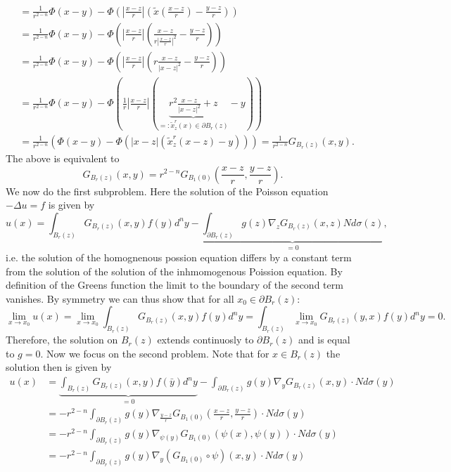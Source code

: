 \documentclass[A4,12pt,twoside]{book}
\begin{document}
{\begin{align*}
        &= \frac{1}{r^{2-n}}  \Phi (x-y) -  \Phi ( |\frac{x-z}{r}| (\tilde{x}(\frac{x-z}{r}) -\frac{y-z}{r})) \\
        &= \frac{1}{r^{2-n}}  \Phi (x-y) -  \Phi (  |\frac{x-z}{r}| (\frac{x-z}{r|\frac{x-z}{r}|^2} -\frac{y-z}{r})) \\
        &= \frac{1}{r^{2-n}}  \Phi (x-y) -  \Phi ( |\frac{x-z}{r}| (r \frac{x-z}{|x-z|^2} -\frac{y-z}{r})) \\
        &= \frac{1}{r^{2-n}}  \Phi (x-y) -  \Phi ( \frac{1}{r} |\frac{x-z}{r}| (\underbrace{r^2 \frac{x-z}{|x-z|^2} + z}_{=: \tilde{x}_z^r (x) \in \partial B_r (z)}-y)) \\
        &= \frac{1}{r^{2-n}} \left( \Phi (x-y) - \Phi ( |x-z| (\tilde{x}_z^r (x-z) -y))  \right) = \frac{1}{r^{2-n}} G_{B_r (z)} (x,y).
    \end{align*}
    The above is equivalent to 
    \[
    G_{B_r (z)} (x,y) = r^{2-n} G_{B_1 (0)} ( \frac{x-z}{r}, \frac{y-z}{r} ).
    \]
    We now do the first subproblem. Here the solution of the Poisson equation $-\Delta u =f$ is given by 
    \[
    u(x) = \int_{B_r (z)} G_{B_r (z)} (x,y) f(y) d^n y -\underbrace{ \int_{\partial B_r (z)}  g(z) \nabla_z G_{B_r (z)} (x,z) N d \sigma (z)}_{=0},
    \]
    i.e. the solution of the homognenous possion equation differs by a constant term from the solution of the solution of the inhmomogenous Poission equation. By definition of the Greens function the limit to the boundary of the second term vanishes. By symmetry we can thus show that for all $x_0 \in \partial B_r (z)$:
    \[
        \lim_{x \to x_0} u(x)=  \lim_{x \to x_0}\int_{B_r (z)} G_{B_r (z)} (x,y) f(y) d^n y = \int_{B_r (z)} \lim_{x \to x_0} G_{B_r (z)} (y,x) f(y) d^n y =0.
    \]
    Therefore, the solution on $B_r (z)$ extends continuosly to $\partial B_r (z)$ and is equal to $g=0$. Now we focus on the second problem. Note that for $x \in B_r (z)$ the solution then is given by 
    \begin{align*}
    u(x) &= \underbrace{\int_{B_r (z)} G_{B_r (z)} (x,y) f(\bar{y}) d^n y}_{=0} - \int_{\partial B_r (z)} g(y) \nabla_{y} G_{B_r (z)}  (x,y) \cdot N d \sigma (y) \\
    &= - r^{2-n} \int_{\partial B_r (z)} g(y) \nabla_{\frac{y-z}{r}} G_{B_1 (0)}  ( \frac{x-z}{r},\frac{y-z}{r}) \cdot N d \sigma (y) \\
    &= - r^{2-n} \int_{\partial B_r (z)} g(y) \nabla_{\psi(y)} G_{B_1 (0)}  ( \psi (x),\psi (y) ) \cdot N d \sigma (y) \\
    &= - r^{2-n} \int_{\partial B_r (z)}  g(y) \nabla_{y} (G_{B_1 (0)}\circ \psi)  ( x,y ) \cdot N d \sigma (y) \\

\end{align*}}
\end{document}
